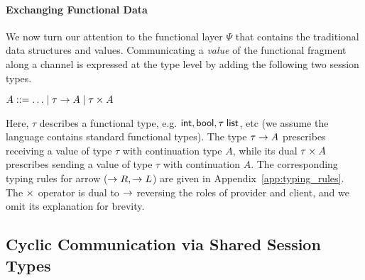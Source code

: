 
\paragraph*{\textbf{Exchanging Functional Data}}
We now turn our attention to the functional layer $\Psi$ that contains the
traditional data structures and values.
Communicating a \emph{value} of the functional fragment along a channel
is expressed at the type level by adding the following two session types.
\begin{center}
\begin{minipage}{0cm}
\begin{tabbing}
$A ::= \ldots \mid \tau \rightarrow A \mid \tau \times A$
\end{tabbing}
\end{minipage}
\end{center}
Here, $\tau$ describes a functional type, e.g. $\mathsf{int}, \mathsf{bool}, \tau \; \mathsf{list}$, etc
(we assume the language contains standard functional types).
The type $\tau \rightarrow A$ prescribes receiving a value of type $\tau$
with continuation type $A$, while its dual $\tau \times A$ prescribes
sending a value of type $\tau$ with continuation $A$. The corresponding
typing rules for arrow ($\rightarrow R, \rightarrow L$) are given in Appendix~\ref{app:typing_rules}.
The $\times$ operator is dual to $\rightarrow$ reversing the roles of provider and client,
and we omit its explanation for brevity.

\subsection{Cyclic Communication via Shared Session Types}
\label{subsec:communicators}

